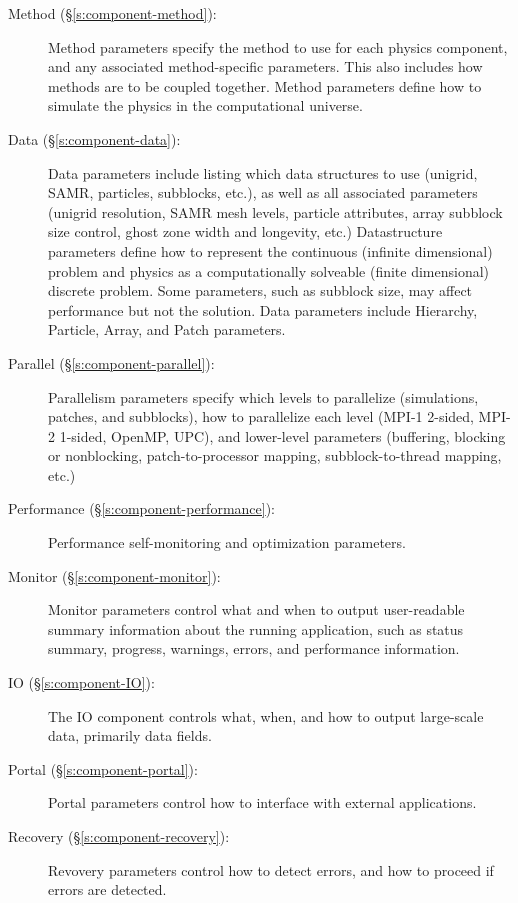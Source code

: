 \begin{description}
 \item [Method (\S\ref{s:component-method}): ] Method parameters specify the
 method to use for each physics component, and any associated
 method-specific parameters.  This also includes how methods are to be
 coupled together.  Method parameters define how to simulate the
 physics in the computational universe.

 \item [Data (\S\ref{s:component-data}): ] Data parameters include listing which
 data structures to use (unigrid, SAMR, particles, subblocks, etc.),
 as well as all associated parameters (unigrid resolution, SAMR mesh
 levels, particle attributes, array subblock size control, ghost zone
 width and longevity, etc.)  Datastructure parameters define how to
 represent the continuous (infinite dimensional) problem and physics
 as a computationally solveable (finite dimensional) discrete problem.
 Some parameters, such as subblock size, may affect performance but
 not the solution.  Data parameters include Hierarchy, Particle,
 Array, and Patch parameters.

 \item [Parallel (\S\ref{s:component-parallel}): ] Parallelism parameters
 specify which levels to parallelize (simulations, patches, and
 subblocks), how to parallelize each level (MPI-1 2-sided, MPI-2
 1-sided, OpenMP, UPC), and lower-level parameters (buffering,
 blocking or nonblocking, patch-to-processor mapping,
 subblock-to-thread mapping, etc.)

 \item [Performance (\S\ref{s:component-performance}): ] Performance
 self-monitoring and optimization parameters.

 \item [Monitor (\S\ref{s:component-monitor}): ] Monitor parameters control what
 and when to output user-readable summary information about the
 running application, such as status summary, progress, warnings,
 errors, and performance information.

 \item [IO (\S\ref{s:component-IO}): ] The IO component controls
  what, when, and how to output large-scale data, primarily data fields.

 \item [Portal (\S\ref{s:component-portal}): ] Portal parameters control
  how to interface with external applications.

 \item [Recovery (\S\ref{s:component-recovery}): ] Revovery parameters
  control how to detect errors, and how to proceed if errors
  are detected.

\end{description}

